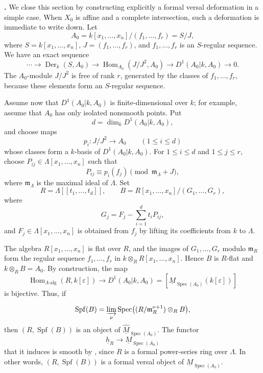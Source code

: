 \medskip
\noindent\textbf{.}
We close this section by constructing explicitly a formal versal
deformation in a simple case. When $X_0$ is affine and a complete
intersection, such a deformation is immediate to write down. Let
\[
A_0=k[x_1,\ldots,x_n]/(f_1,\ldots,f_r)=S/J,
\]
where $S=k[x_1,\ldots,x_n]$, $J=(f_1,\ldots,f_r)$, and
$f_1,\ldots,f_r$ is an $S$-regular sequence. We have an exact
sequence
\[
\cdots\longrightarrow\operatorname{Der}_k(S,A_0)
\longrightarrow\operatorname{Hom}_{A_0}(J/J^2,A_0)
\longrightarrow D^1(A_0|k,A_0)\longrightarrow0.
\]
The $A_0$-module $J/J^2$ is free of rank $r$, generated by the
classes of $f_1,\ldots,f_r$, because these elements form an
$S$-regular sequence.

Assume now that $D^1(A_0|k,A_0)$ is finite-dimensional over $k$;
for example, assume that $A_0$ has only isolated nonsmooth points.
Put
\[
d=\dim_kD^1(A_0|k,A_0),
\]
and choose maps
\[
p_i:J/J^2\longrightarrow A_0\qquad(1\leq i\leq d)
\]
whose classes form a $k$-basis of $D^1(A_0|k,A_0)$. For
$1\leq i\leq d$ and $1\leq j\leq r$, choose
$P_{ij}\in\Lambda[x_1,\ldots,x_n]$ such that
\[
P_{ij}\equiv p_i(f_j)\pmod{\mathfrak m_\Lambda+J},
\]
where $\mathfrak m_\Lambda$ is the maximal ideal of $\Lambda$. Set
\[
R=\Lambda[[t_1,\ldots,t_d]],
\qquad
B=R[x_1,\ldots,x_n]/(G_1,\ldots,G_r),
\]
where
\[
G_j=F_j-\sum_{i=1}^d t_iP_{ij},
\]
and $F_j\in\Lambda[x_1,\ldots,x_n]$ is obtained from $f_j$ by
lifting its coefficients from $k$ to $\Lambda$.

The algebra $R[x_1,\ldots,x_n]$ is flat over $R$, and the images of
$G_1,\ldots,G_r$ modulo $\mathfrak m_R$ form the regular sequence
$f_1,\ldots,f_r$ in
$k\otimes_RR[x_1,\ldots,x_n]$. Hence $B$ is $R$-flat and
$k\otimes_RB=A_0$. By construction, the map
\[
\operatorname{Hom}_{\Lambda\text{-alg}}(R,k[\varepsilon])
\longrightarrow D^1(A_0|k,A_0)
=[\underline M_{\operatorname{Spec}(A_0)}(k[\varepsilon])]
\]
is bijective. Thus, if


\[
\operatorname{Spf}(B)
=\varinjlim_\nu
\operatorname{Spec}\bigl((R/\mathfrak m_R^{\nu+1})\otimes_RB\bigr),
\]
then $(R,\operatorname{Spf}(B))$ is an object of
$\widehat{\underline M}_{\operatorname{Spec}(A_0)}$. The functor
\[
\underline h_R\longrightarrow\underline M_{\operatorname{Spec}(A_0)}
\]
that it induces is smooth by , since $R$ is a formal power-series
ring over $\Lambda$. In other words,
$(R,\operatorname{Spf}(B))$ is a formal versal object of
$\underline M_{\operatorname{Spec}(A_0)}$.

